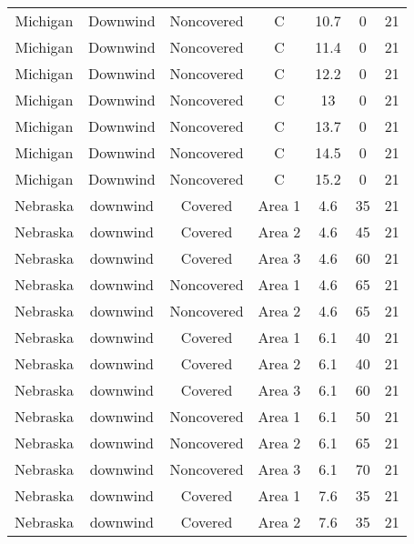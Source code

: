\documentclass{article}
\begin{document}
\begin{longtable}[c]{ccccccc}
Michigan  & Downwind  & Noncovered & C               & 10.7         & 0           & 21  \\
Michigan  & Downwind  & Noncovered & C               & 11.4         & 0           & 21  \\
Michigan  & Downwind  & Noncovered & C               & 12.2         & 0           & 21  \\
Michigan  & Downwind  & Noncovered & C               & 13           & 0           & 21  \\
Michigan  & Downwind  & Noncovered & C               & 13.7         & 0           & 21  \\
Michigan  & Downwind  & Noncovered & C               & 14.5         & 0           & 21  \\
Michigan  & Downwind  & Noncovered & C               & 15.2         & 0           & 21  \\
Nebraska  & downwind  & Covered     & Area 1          & 4.6          & 35          & 21  \\
Nebraska  & downwind  & Covered     & Area 2          & 4.6          & 45          & 21  \\
Nebraska  & downwind  & Covered     & Area 3          & 4.6          & 60          & 21  \\
Nebraska  & downwind  & Noncovered & Area 1          & 4.6          & 65          & 21  \\
Nebraska  & downwind  & Noncovered & Area 2          & 4.6          & 65          & 21  \\
Nebraska  & downwind  & Covered     & Area 1          & 6.1          & 40          & 21  \\
Nebraska  & downwind  & Covered     & Area 2          & 6.1          & 40          & 21  \\
Nebraska  & downwind  & Covered     & Area 3          & 6.1          & 60          & 21  \\
Nebraska  & downwind  & Noncovered & Area 1          & 6.1          & 50          & 21  \\
Nebraska  & downwind  & Noncovered & Area 2          & 6.1          & 65          & 21  \\
Nebraska  & downwind  & Noncovered & Area 3          & 6.1          & 70          & 21  \\
Nebraska  & downwind  & Covered     & Area 1          & 7.6          & 35          & 21  \\
Nebraska  & downwind  & Covered     & Area 2          & 7.6          & 35          & 21  \\

\end{longtable}
\end{document}

